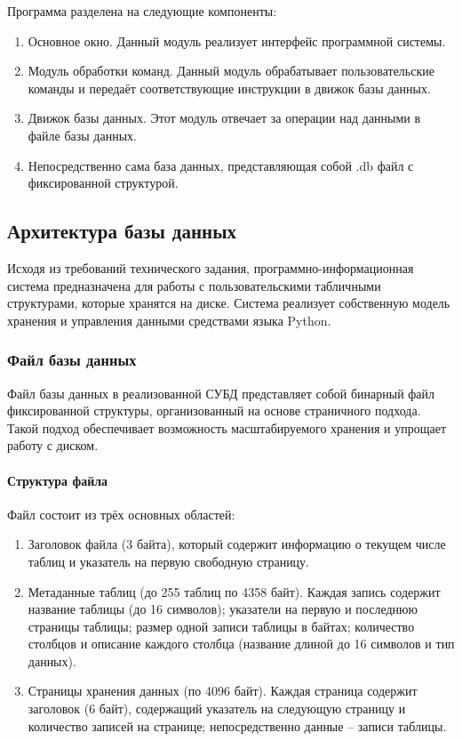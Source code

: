 Программа разделена на следующие компоненты:
\begin{enumerate}
	\item Основное окно. Данный модуль реализует интерфейс программной системы.
	\item Модуль обработки команд. Данный модуль обрабатывает пользовательские команды и передаёт соответствующие инструкции в движок базы данных.
	\item Движок базы данных. Этот модуль отвечает за операции над данными в файле базы данных.
	\item Непосредственно сама база данных, представляющая собой .db файл с фиксированной структурой.
\end{enumerate}

\subsection{Архитектура базы данных}

Исходя из требований технического задания, программно-информационная система предназначена для работы с пользовательскими табличными структурами, которые хранятся на диске. Система реализует собственную модель хранения и управления данными средствами языка Python.

\subsubsection{Файл базы данных}

Файл базы данных в реализованной СУБД представляет собой бинарный файл фиксированной структуры, организованный на основе страничного подхода. Такой подход обеспечивает возможность масштабируемого хранения и упрощает работу с диском.

\paragraph{Структура файла}

Файл состоит из трёх основных областей:
\begin{enumerate}
	\item Заголовок файла (3 байта), который содержит информацию о текущем числе таблиц и указатель на первую свободную страницу.
	\item Метаданные таблиц (до 255 таблиц по 4358 байт). Каждая запись содержит название таблицы (до 16 символов); указатели на первую и последнюю страницы таблицы; размер одной записи таблицы в байтах; количество столбцов и описание каждого столбца (название длиной до 16 символов и тип данных).
	\item Страницы хранения данных (по 4096 байт). Каждая страница содержит заголовок (6 байт), содержащий указатель на следующую страницу и количество записей на странице; непосредственно данные -- записи таблицы.
\end{enumerate}

